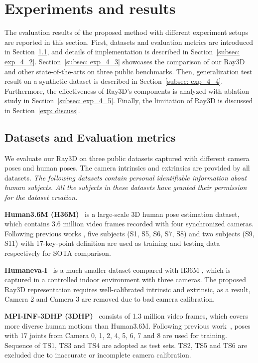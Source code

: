 \documentclass[10pt,twocolumn,letterpaper]{article}
\begin{document}
\section{Experiments and results}
The evaluation results of the proposed method with different experiment setups are reported in this section. First, datasets and evaluation metrics are introduced in Section~\ref{subsec: exp_4_1}, and details of implementation is described in Section~\ref{subsec: exp_4_2}. Section~\ref{subsec: exp_4_3} showcases the comparison of our Ray3D and other state-of-the-arts on three public benchmarks. Then, generalization test result on a synthetic dataset is described in Section~\ref{subsec: exp_4_4}. Furthermore, the effectiveness of Ray3D's components is analyzed with ablation study in Section~\ref{subsec: exp_4_5}. Finally, the limitation of Ray3D is discussed in Section~\ref{exp: discuss}.
\subsection{Datasets and Evaluation metrics}
\label{subsec: exp_4_1}


We evaluate our Ray3D on three public datasets captured with different camera poses and human poses. The camera intrinsics and extrinsics are provided by all datasets. \emph{The following datasets contain personal identifiable information about human subjects. All the subjects in these datasets have granted their permission for the dataset creation.}

\noindent\textbf{Human3.6M (H36M)}~\cite{ionescu2013human3} is a large-scale 3D human pose estimation dataset, which contains 3.6 million video frames recorded with four synchronized cameras. Following previous works \cite{dario2019videopose,ce2021poseformer}, five subjects (S1, S5, S6, S7, S8) and two subjects (S9, S11) with 17-key-point definition are used as training and testing data respectively for SOTA comparison.

\noindent\textbf{Humaneva-I}~\cite{SigalBB10} is a much smaller dataset compared with H36M , which is captured in a controlled indoor environment with three cameras. The proposed Ray3D representation requires well-calibrated intrinsic and  extrinsic, as a result, Camera 2 and Camera 3 are removed due to bad camera calibration.

\noindent\textbf{MPI-INF-3DHP (3DHP)}~\cite{mehta2017monocular_3dhp} consists of 1.3 million video frames, which covers more diverse human motions than Human3.6M. Following previous work~\cite{GongZF21}, poses with 17 joints from Camera 0, 1, 2, 4, 5, 6, 7 and 8 are used for training. Sequence of TS1, TS3 and TS4 are adopted as test sets. TS2, TS5 and TS6 are excluded due to inaccurate or incomplete camera calibration.
\end{document}
